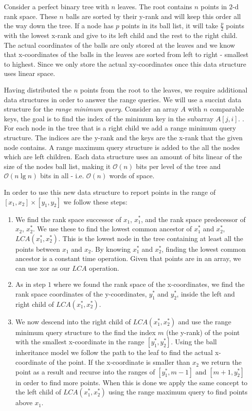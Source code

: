 Consider a perfect binary tree with $n$ leaves. The root contains $n$ points in $2$-d rank space. These $n$ balls are sorted by their y-rank and will keep this order all the way down the tree. If a node has $p$ points in its ball list, it will take $\frac{p}{2}$ points with the lowest x-rank and give to its left child and the rest to the right child. The actual coordinates of the balls are only stored at the leaves and we know that x-coordinates of the balls in the leaves are sorted from left to right - smallest to highest. Since we only store the actual xy-coordinates once this data structure uses linear space.

Having distributed the $n$ points from the root to the leaves, we require additional data structures in order to answer the range queries. We will use a succint data structure for the \emph{range minimum query}. Consider an array $A$ with $n$ comparable keys, the goal is to find the index of the minimum key in the subarray $A[j,i]$. . For each node in the tree that is a right child we add a range minimum query structure. The indices are the y-rank and the keys are the x-rank that the given node contains. A range maximum query structure is added to the all the nodes which are left children. Each data structure uses an amount of bits linear of the size of the nodes ball list, making it $\mathcal{O}(n)$ bits per level of the tree and $\mathcal{O}(n \lg n)$ bits in all - i.e. $\mathcal{O}(n)$ words of space.

In order to use this new data structure to report points in the range of $[x_1, x_2] \times [y_1, y_2]$ we follow these steps:
\begin{enumerate}
  \item We find the rank space successor of $x_1$, $x^*_1$, and the rank space predecessor of $x_2$, $x^*_2$. We use these to find the lowest common ancestor of $x^*_1$ and $x^*_2$, $LCA(x^*_1, x^*_2)$. This is the lowest node in the tree containing at least all the points between $x_1$ and $x_2$. By knowing $x^*_1$ and $x^*_2$, finding the lowest common ancestor is a constant time operation. Given that points are in an array, we can use xor as our $LCA$ operation. 
  \item As in step $1$ where we found the rank space of the x-coordinates, we find the rank space coordinates of the y-coordinates, $y^*_1$ and $y^*_2$, inside the left and right child of $LCA(x^*_1, x^*_2)$.
  \item We now descend into the right child of $LCA(x^*_1, x^*_2)$ and use the range minimum query structure to the find the index $m$ (the y-rank) of the point with the smallest x-coordinate in the range $[y^*_1, y^*_2]$. Using the ball inheritance model we follow the path to the leaf to find the actual x-coordinate of the point. If the x-coordinate is smaller than $x_2$ we return the point as a result and recurse into the ranges of $[y^*_1, m-1]$ and $[m+1, y^*_2]$ in order to find more points. When this is done we apply the same concept to the left child of $LCA(x^*_1, x^*_2)$ using the range maximum query to find points above $x_1$.
\end{enumerate}

